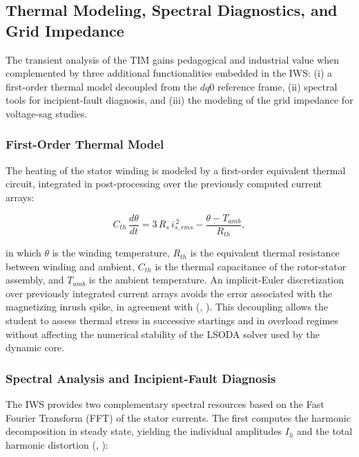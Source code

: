 \subsection{Thermal Modeling, Spectral Diagnostics, and Grid Impedance}
\label{subsec:diagnostics_en}

The transient analysis of the TIM gains pedagogical and industrial value when complemented by three additional functionalities embedded in the IWS: (i) a first-order thermal model decoupled from the $dq0$ reference frame, (ii) spectral tools for incipient-fault diagnosis, and (iii) the modeling of the grid impedance for voltage-sag studies.

\subsubsection{First-Order Thermal Model}

The heating of the stator winding is modeled by a first-order equivalent thermal circuit, integrated in post-processing over the previously computed current arrays:

\begin{equation}
\label{eq:thermal_en}
C_{th}\,\frac{d\theta}{dt} = 3\,R_s\,i_{s,rms}^{\,2} - \frac{\theta - T_{amb}}{R_{th}},
\end{equation}

\noindent in which $\theta$ is the winding temperature, $R_{th}$ is the equivalent thermal resistance between winding and ambient, $C_{th}$ is the thermal capacitance of the rotor-stator assembly, and $T_{amb}$ is the ambient temperature. An implicit-Euler discretization over previously integrated current arrays avoids the error associated with the magnetizing inrush spike, in agreement with (\citeauthor{karakas2009aggregation}, \citeyear{karakas2009aggregation}). This decoupling allows the student to assess thermal stress in successive startings and in overload regimes without affecting the numerical stability of the LSODA solver used by the dynamic core.

\subsubsection{Spectral Analysis and Incipient-Fault Diagnosis}

The IWS provides two complementary spectral resources based on the Fast Fourier Transform (FFT) of the stator currents. The first computes the harmonic decomposition in steady state, yielding the individual amplitudes $I_h$ and the total harmonic distortion (\citeauthor{mohapatra2019steady}, \citeyear{mohapatra2019steady}):


